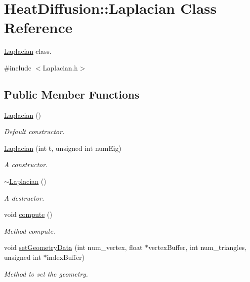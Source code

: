 \hypertarget{classHeatDiffusion_1_1Laplacian}{\section{Heat\-Diffusion\-:\-:Laplacian Class Reference}
\label{classHeatDiffusion_1_1Laplacian}
}


\hyperlink{classHeatDiffusion_1_1Laplacian}{Laplacian} class.  




{\ttfamily \#include $<$Laplacian.\-h$>$}

\subsection*{Public Member Functions}
\begin{DoxyCompactItemize}
\item 
\hyperlink{classHeatDiffusion_1_1Laplacian_af6d49e30673bad36c54577b5ef308713}{Laplacian} ()
\begin{DoxyCompactList}\small\item\em Default constructor. \end{DoxyCompactList}\item 
\hyperlink{classHeatDiffusion_1_1Laplacian_a5b2884cae28c3a3372efb8fc68dc4adf}{Laplacian} (int t, unsigned int num\-Eig)
\begin{DoxyCompactList}\small\item\em A constructor. \end{DoxyCompactList}\item 
\hyperlink{classHeatDiffusion_1_1Laplacian_a6d75faab3515606259805213f5d839f2}{$\sim$\-Laplacian} ()
\begin{DoxyCompactList}\small\item\em A destructor. \end{DoxyCompactList}\item 
void \hyperlink{classHeatDiffusion_1_1Laplacian_ac5dc801c9abcb1f493b0eba983462d89}{compute} ()
\begin{DoxyCompactList}\small\item\em Method compute. \end{DoxyCompactList}\item 
void \hyperlink{classHeatDiffusion_1_1Laplacian_ac523d3ba9a52b77695a0f8c7f0b32211}{set\-Geometry\-Data} (int num\-\_\-vertex, float $\ast$vertex\-Buffer, int num\-\_\-triangles, unsigned int $\ast$index\-Buffer)
\begin{DoxyCompactList}\small\item\em Method to set the geometry. \end{DoxyCompactList}\item 

\end{DoxyCompactItemize}

